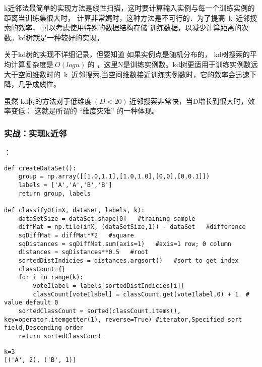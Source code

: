 k近邻法最简单的实现方法是线性扫描，这时要计算输入实例与每一个训练实例的距离当训练集很大时， 计算非常娓时，这种方法是不可行的．为了提高~k~近邻搜索的效率， 可以考虑使用特殊的数据结构存储 训练数据，以减少计算距离的次数。kd树就是一种较好的实现。

关于kd树的实现不详细记录，但要知道 如果实例点是随机分布的， kd树搜索的平均计算复杂度是$~O(logn)~$的 ，这里N是训练实例数。kd树更适用于训练实例数远大于空间维数时的~k~近邻搜索,当空间维数接近训练实例数时，它的效率会迅速下降，几乎成线性。

虽然 kd树的方法对于低维度$~(D<20)~$近邻搜索非常快，当D增长到很大时，效率变低： 这就是所谓的 “维度灾难” 的一种体现。

\subsubsection{实战：实现k近邻}
：
\begin{lstlisting}
def createDataSet():
    group = np.array([[1.0,1.1],[1.0,1.0],[0,0],[0,0.1]])
    labels = ['A','A','B','B']
    return group, labels

def classify0(inX, dataSet, labels, k):
    dataSetSize = dataSet.shape[0]   #training sample
    diffMat = np.tile(inX, (dataSetSize,1)) - dataSet   #difference
    sqDiffMat = diffMat**2   #square
    sqDistances = sqDiffMat.sum(axis=1)   #axis=1 row; 0 column
    distances = sqDistances**0.5   #root
    sortedDistIndicies = distances.argsort()   #sort to get index
    classCount={}
    for i in range(k):
        voteIlabel = labels[sortedDistIndicies[i]]
        classCount[voteIlabel] = classCount.get(voteIlabel,0) + 1  # value default 0
    sortedClassCount = sorted(classCount.items(), key=operator.itemgetter(1), reverse=True) #iterator,Specified sort field,Descending order
    return sortedClassCount
\end{lstlisting}

\begin{lstlisting}
k=3
[('A', 2), ('B', 1)]
\end{lstlisting}


